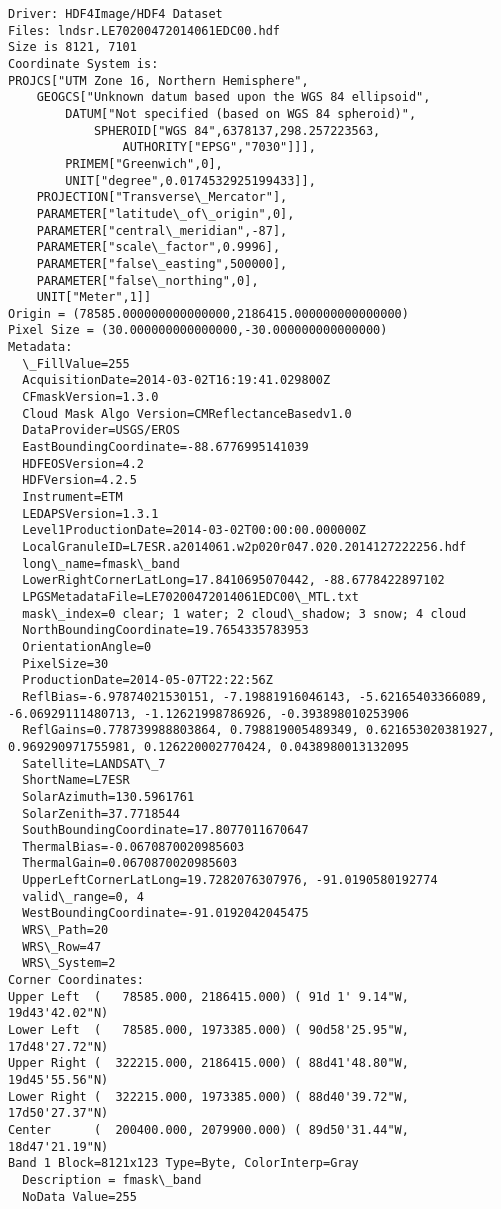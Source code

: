\documentclass{article}
\begin{document}
    \begin{Verbatim}[commandchars=\\\{\}]
Driver: HDF4Image/HDF4 Dataset
Files: lndsr.LE70200472014061EDC00.hdf
Size is 8121, 7101
Coordinate System is:
PROJCS["UTM Zone 16, Northern Hemisphere",
    GEOGCS["Unknown datum based upon the WGS 84 ellipsoid",
        DATUM["Not specified (based on WGS 84 spheroid)",
            SPHEROID["WGS 84",6378137,298.257223563,
                AUTHORITY["EPSG","7030"]]],
        PRIMEM["Greenwich",0],
        UNIT["degree",0.0174532925199433]],
    PROJECTION["Transverse\_Mercator"],
    PARAMETER["latitude\_of\_origin",0],
    PARAMETER["central\_meridian",-87],
    PARAMETER["scale\_factor",0.9996],
    PARAMETER["false\_easting",500000],
    PARAMETER["false\_northing",0],
    UNIT["Meter",1]]
Origin = (78585.000000000000000,2186415.000000000000000)
Pixel Size = (30.000000000000000,-30.000000000000000)
Metadata:
  \_FillValue=255
  AcquisitionDate=2014-03-02T16:19:41.029800Z
  CFmaskVersion=1.3.0
  Cloud Mask Algo Version=CMReflectanceBasedv1.0
  DataProvider=USGS/EROS
  EastBoundingCoordinate=-88.6776995141039
  HDFEOSVersion=4.2
  HDFVersion=4.2.5
  Instrument=ETM
  LEDAPSVersion=1.3.1
  Level1ProductionDate=2014-03-02T00:00:00.000000Z
  LocalGranuleID=L7ESR.a2014061.w2p020r047.020.2014127222256.hdf
  long\_name=fmask\_band
  LowerRightCornerLatLong=17.8410695070442, -88.6778422897102
  LPGSMetadataFile=LE70200472014061EDC00\_MTL.txt
  mask\_index=0 clear; 1 water; 2 cloud\_shadow; 3 snow; 4 cloud
  NorthBoundingCoordinate=19.7654335783953
  OrientationAngle=0
  PixelSize=30
  ProductionDate=2014-05-07T22:22:56Z
  ReflBias=-6.97874021530151, -7.19881916046143, -5.62165403366089, -6.06929111480713, -1.12621998786926, -0.393898010253906
  ReflGains=0.778739988803864, 0.798819005489349, 0.621653020381927, 0.969290971755981, 0.126220002770424, 0.0438980013132095
  Satellite=LANDSAT\_7
  ShortName=L7ESR
  SolarAzimuth=130.5961761
  SolarZenith=37.7718544
  SouthBoundingCoordinate=17.8077011670647
  ThermalBias=-0.0670870020985603
  ThermalGain=0.0670870020985603
  UpperLeftCornerLatLong=19.7282076307976, -91.0190580192774
  valid\_range=0, 4
  WestBoundingCoordinate=-91.0192042045475
  WRS\_Path=20
  WRS\_Row=47
  WRS\_System=2
Corner Coordinates:
Upper Left  (   78585.000, 2186415.000) ( 91d 1' 9.14"W, 19d43'42.02"N)
Lower Left  (   78585.000, 1973385.000) ( 90d58'25.95"W, 17d48'27.72"N)
Upper Right (  322215.000, 2186415.000) ( 88d41'48.80"W, 19d45'55.56"N)
Lower Right (  322215.000, 1973385.000) ( 88d40'39.72"W, 17d50'27.37"N)
Center      (  200400.000, 2079900.000) ( 89d50'31.44"W, 18d47'21.19"N)
Band 1 Block=8121x123 Type=Byte, ColorInterp=Gray
  Description = fmask\_band
  NoData Value=255
    \end{Verbatim}
\end{document}
